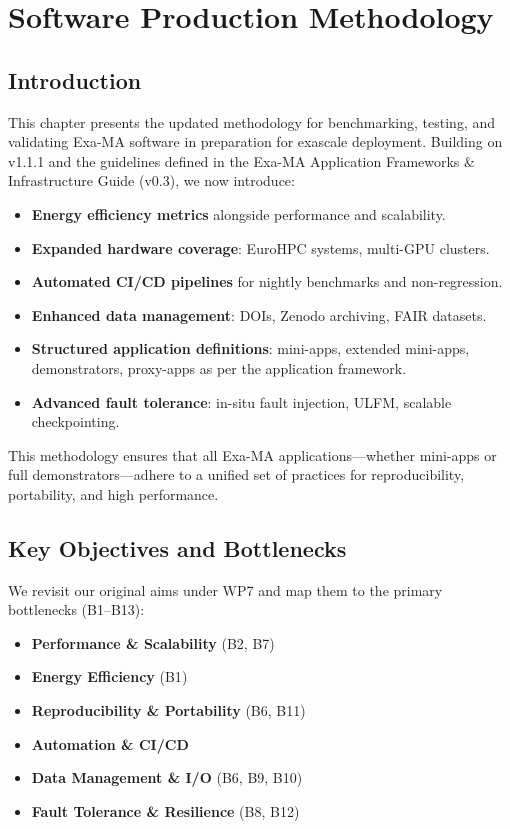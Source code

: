 
\chapter{Software Production Methodology}
\label{chap:methodology}

\section{Introduction}
This chapter presents the updated methodology for benchmarking, testing, and validating Exa-MA software in preparation for exascale deployment. Building on v1.1.1 and the guidelines defined in the Exa-MA Application Frameworks \& Infrastructure Guide (v0.3), we now introduce:

\begin{itemize}
  \item \textbf{Energy efficiency metrics} alongside performance and scalability.
  \item \textbf{Expanded hardware coverage}: EuroHPC systems, multi-GPU clusters.
  \item \textbf{Automated CI/CD pipelines} for nightly benchmarks and non-regression.
  \item \textbf{Enhanced data management}: DOIs, Zenodo archiving, FAIR datasets.
  \item \textbf{Structured application definitions}: mini-apps, extended mini-apps, demonstrators, proxy-apps as per the application framework.
  \item \textbf{Advanced fault tolerance}: in-situ fault injection, ULFM, scalable checkpointing.
\end{itemize}

This methodology ensures that all Exa-MA applications—whether mini-apps or full demonstrators—adhere to a unified set of practices for reproducibility, portability, and high performance.

\section{Key Objectives and Bottlenecks}
We revisit our original aims under WP7 and map them to the primary bottlenecks (B1--B13):

\begin{itemize}
  \item \textbf{Performance \& Scalability} (\ac{B2}, \ac{B7})
  \item \textbf{Energy Efficiency} (\ac{B1})
  \item \textbf{Reproducibility \& Portability} (\ac{B6}, \ac{B11})
  \item \textbf{Automation \& CI/CD}
  \item \textbf{Data Management \& I/O} (\ac{B6}, \ac{B9}, \ac{B10})
  \item \textbf{Fault Tolerance \& Resilience} (\ac{B8}, \ac{B12})
\end{itemize}

